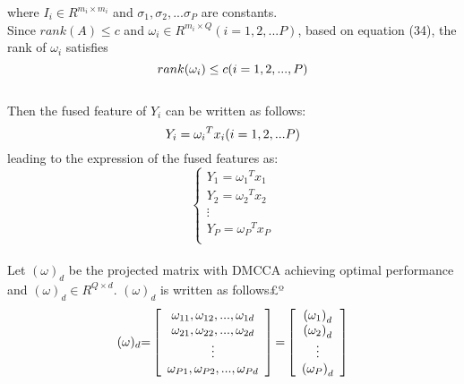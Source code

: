 \documentclass[journal]{IEEEtran}
\begin{document}
where ${I_i} \in {R^{{m_i} \times {m_i}}}$ and ${\sigma _1},{\sigma _2},...{\sigma _P}$ are constants.\\\indent
Since $rank(A) \le c$ and ${\omega _i} \in {R^{{m_i} \times Q}}(i = 1,2,...P)$, based on equation (34), the rank of ${\omega _i}$ satisfies
\begin{equation}
rank({\omega _i}) \le c{\rm{    }}      (i = 1,2,...,P)
\end{equation}\\\indent
Then the fused feature of ${Y_i}$ can be written as follows:
\begin{equation}
{Y_i} = {\omega _i}^T{x_i}{\rm{    }}(i = 1,2,...P)
\end{equation}
leading to the expression of the fused features as:
\begin{equation}
\left\{ {\begin{array}{*{20}{c}}
   {{Y_1} = {\omega _1}^T{x_1}}  \\
   {{Y_2} = {\omega _2}^T{x_2}}  \\
    \vdots   \\
   {{Y_P} = {\omega _P}^T{x_P}}  \\
\end{array}} \right.
\end{equation}\\\indent
Let ${(\omega )_d}$ be the projected matrix with DMCCA achieving optimal performance and ${(\omega )_d} \in {R^{Q \times d}}$. ${(\omega )_d}$ is written as follows£º
\begin{equation}
{(\omega )_d}{\rm{ = }}\left[ {\begin{array}{*{20}{c}}
   {{\omega _{11}},{\omega _{12}},...,{\omega _{1d}}}  \\
   {{\omega _{21}},{\omega _{22}},...,{\omega _{2d}}}  \\
    \vdots   \\
   {{\omega _{P1}},{\omega _{P2}},...,{\omega _{Pd}}}  \\
\end{array}} \right]{\rm{ = }}\left[ {\begin{array}{*{20}{c}}
   {{{({\omega _1})}_d}}  \\
   {{{({\omega _2})}_d}}  \\
    \vdots   \\
   {{{({\omega _P})}_d}}  \\
\end{array}} \right]
\end{equation}\\\indent
\end{document}
